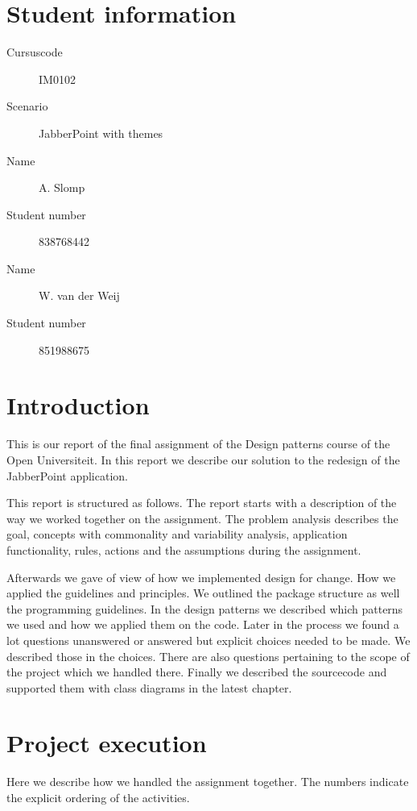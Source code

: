 \documentclass[a4paper]{article}
\begin{document}
\pagestyle{fancy}

\section*{Student information}
\begin{description}
	\item [Cursuscode] IM0102
	\item [Scenario] JabberPoint with themes
	\item [Name] A. Slomp
	\item [Student number] 838768442
	\item [Name] W. van der Weij
	\item [Student number] 851988675
\end{description}

\section{Introduction}
This is our report of the final assignment of the Design patterns course of the Open Universiteit. In this report we describe our solution to the redesign of the JabberPoint application.

This report is structured as follows.
The report starts with a description of the way we worked together on the assignment. 
The problem analysis describes the goal, concepts with commonality and variability analysis, application functionality, rules, actions and the assumptions during the assignment.

Afterwards we gave of view of how we implemented design for change. How we applied the guidelines and principles. We outlined the package structure as well the programming guidelines.
In the design patterns we described which patterns we used and how we applied them on the code.
Later in the process we found a lot questions unanswered or answered but explicit choices needed to be made. We described those in the choices. There are also questions pertaining to the scope of the project which we handled there.
Finally we described the sourcecode and supported them with class diagrams in the latest chapter.


\section{Project execution}

Here we describe how we handled the assignment together. The numbers indicate the explicit ordering of the activities. 
\end{document}
